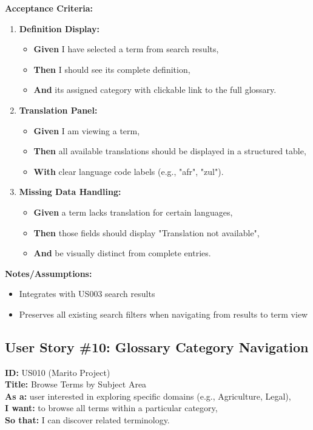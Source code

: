 \documentclass[12pt]{article}
\begin{document}
\vspace{1em}
\textbf{Acceptance Criteria:}
\begin{enumerate}
    \item \textbf{Definition Display:}
    \begin{itemize}
        \item \textbf{Given} I have selected a term from search results,
        \item \textbf{Then} I should see its complete definition,
        \item \textbf{And} its assigned category with clickable link to the full glossary.
    \end{itemize}

    \item \textbf{Translation Panel:}
    \begin{itemize}
        \item \textbf{Given} I am viewing a term,
        \item \textbf{Then} all available translations should be displayed in a structured table,
        \item \textbf{With} clear language code labels (e.g., "afr", "zul").
    \end{itemize}

    \item \textbf{Missing Data Handling:}
    \begin{itemize}
        \item \textbf{Given} a term lacks translation for certain languages,
        \item \textbf{Then} those fields should display "Translation not available",
        \item \textbf{And} be visually distinct from complete entries.
    \end{itemize}
\end{enumerate}

\vspace{1em}
\textbf{Notes/Assumptions:}
\begin{itemize}
    \item Integrates with US003 search results
    \item Preserves all existing search filters when navigating from results to term view
\end{itemize}

\subsection{User Story \#10: Glossary Category Navigation}
\textbf{ID:} US010 (Marito Project) \\
\textbf{Title:} Browse Terms by Subject Area \\
\textbf{As a:} user interested in exploring specific domains (e.g., Agriculture, Legal), \\
\textbf{I want:} to browse all terms within a particular category, \\
\textbf{So that:} I can discover related terminology.
\end{document}
